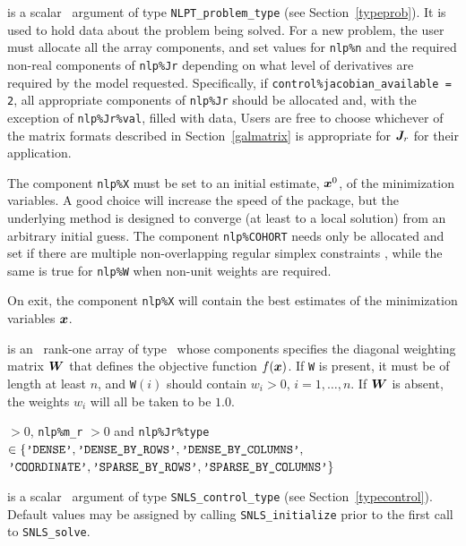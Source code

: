 \documentclass{galahad}
\newcommand{\packagename}{SNLS}
\begin{document}
\vspace*{-2mm}
\begin{description}
 is a scalar \intentinout\ argument of type
{\tt NLPT\_problem\_type}
(see Section~\ref{typeprob}).
It is used to hold data about the problem being solved.
For a new problem, the user must allocate all the array components,
and set values for {\tt nlp\%n}
and the required non-real components of
{\tt nlp\%Jr} depending on what level
of derivatives are required by the model requested. Specifically,
if {\tt control\%jacobian\_available = 2},
all appropriate components of {\tt nlp\%Jr} should be allocated and, 
with the exception of {\tt nlp\%Jr\%val},
filled with data,
Users are free to choose whichever
of the matrix formats described in Section~\ref{galmatrix}
is appropriate for ${\bm{J}}_r$ for their application.

\noindent
The component {\tt nlp\%X} must be set to an initial estimate, ${\bm{x}}^{0}$,
of the minimization variables. A good choice will increase the speed
of the package, but the underlying method is designed to converge (at least
to a local solution) from an arbitrary initial guess.
The component {\tt nlp\%COHORT} needs only be allocated and set if there are 
multiple non-overlapping regular simplex constraints , while 
the same is true for {\tt nlp\%W} when non-unit weights are required.

\noindent
On exit, the component {\tt nlp\%X} will contain the best estimates of the
minimization variables ${\bm{x}}$.

 is an \optional\ rank-one array of type \realdp\
whose components specifies the diagonal weighting matrix ${\bm{W}}$ that
defines the objective function $f({\bm{x}})$. If {\tt W} is present, it
must be of length at least $n$, and {\tt W}$(i)$ should contain $w_i > 0$,
$i = 1, \ldots, n$. If ${\bm{W}}$ is absent, the weights $w_i$ will all be
taken to be $1.0$.

\noindent
{} $> 0$, {\tt nlp\%m\_r} $> 0$ and
{\tt nlp\%Jr\%type} $\in \{
  \mbox{\tt 'DENSE'}, \mbox{\tt 'DENSE\_BY\_ROWS'}, 
  \mbox{\tt 'DENSE\_BY\_COLUMNS'},$ $
  \mbox{\tt 'COORDINATE'}, \mbox{\tt 'SPARSE\_BY\_ROWS'},
  \mbox{\tt 'SPARSE\_BY\_COLUMNS'} \}$ 

 is a scalar \intentin\ argument of type
{\tt \packagename\_control\_type}
(see Section~\ref{typecontrol}). Default values may be assigned by calling
{\tt \packagename\_initialize} prior to the first call to
{\tt \packagename\_solve}. 


\end{description}
\end{document}
